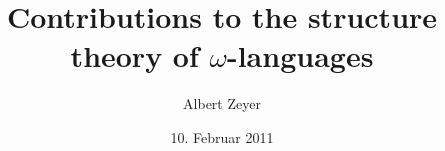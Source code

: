 \documentclass{article}
\begin{document}
\title{Contributions to the structure theory of $\omega$-languages}
\author{Albert Zeyer}
\date{10. Februar 2011}

\maketitle
\tableofcontents







\printindex
\end{document}
